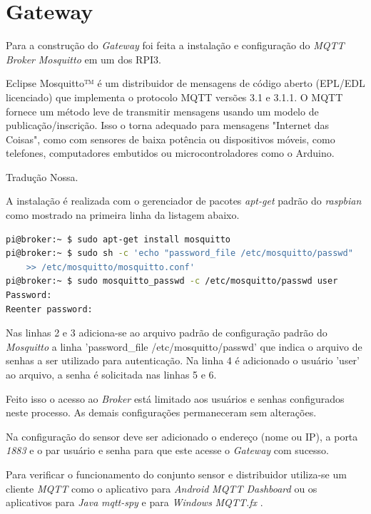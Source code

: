 \section{Gateway}
\label{sec:app-gw}

Para a construção do \emph{Gateway} foi feita a instalação e configuração do
\emph{MQTT Broker} \emph{Mosquitto} em um dos RPI3.

\begin{citacao}

	Eclipse Mosquitto™ é um distribuidor de mensagens de código aberto (EPL/EDL
	licenciado) que implementa o protocolo MQTT versões 3.1 e 3.1.1. O MQTT
	fornece um método leve de transmitir mensagens usando um modelo de
	publicação/inscrição. Isso o torna adequado para mensagens "Internet das
	Coisas", como com sensores de baixa potência ou dispositivos móveis, como
	telefones, computadores embutidos ou microcontroladores como o Arduino. \

	 Tradução Nossa.
\end{citacao}


A instalação é realizada com o gerenciador de pacotes \emph{apt-get} padrão do
\emph{raspbian} como mostrado na primeira linha da listagem abaixo.

\begin{lstlisting}[language=bash]
pi@broker:~ $ sudo apt-get install mosquitto
pi@broker:~ $ sudo sh -c 'echo "password_file /etc/mosquitto/passwd"
	>> /etc/mosquitto/mosquitto.conf'
pi@broker:~ $ sudo mosquitto_passwd -c /etc/mosquitto/passwd user
Password:
Reenter password:
\end{lstlisting}

Nas linhas 2 e 3 adiciona-se ao arquivo padrão de configuração padrão do
\emph{Mosquitto} a linha 'password\_file /etc/mosquitto/passwd' que
indica o arquivo de senhas a ser utilizado para autenticação. Na linha 4 é
adicionado o usuário 'user' ao arquivo, a senha é solicitada  nas
linhas 5 e 6.

Feito isso o acesso ao \emph{Broker} está limitado aos usuários e senhas
configurados neste processo. As demais configurações permaneceram sem alterações.

Na configuração do sensor deve ser adicionado o endereço (nome ou IP), a porta
\emph{1883} e o par usuário e senha para que este acesse o \emph{Gateway} com
sucesso.

Para verificar o funcionamento do conjunto sensor e distribuidor utiliza-se um
cliente \emph{MQTT} como o aplicativo para \emph{Android} \emph{MQTT Dashboard}
\cite{mqttdash} ou os aplicativos para \emph{Java} \emph{mqtt-spy}
\cite{mqttspy} e para \emph{Windows} \emph{MQTT.fx} \cite{mqttfx}.

